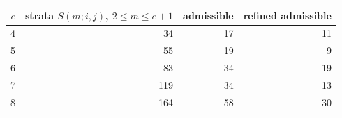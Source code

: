 \begin{tabular}{@{}rrrr@{}}
\toprule
$e$ & strata $S(m;i,j)$, $2\le m\le e+1$ & admissible & refined admissible\\
\midrule
4 & 34 & 17 & 11\\
5 & 55 & 19 & 9\\
6 & 83 & 34 & 19\\
7 & 119 & 34 & 13\\
8 & 164 & 58 & 30\\
\bottomrule
\end{tabular}
